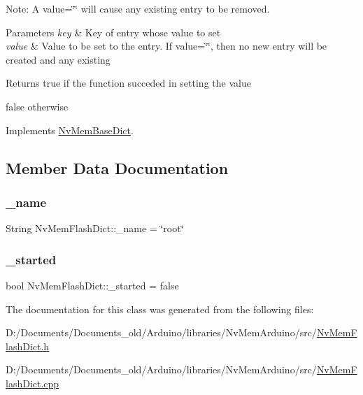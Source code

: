 Note\+: A {\ttfamily value=\char`\"{}\char`\"{}} will cause any existing entry to be removed.


\begin{DoxyParams}{Parameters}
{\em key} & Key of entry whose value to set \\
\hline
{\em value} & Value to be set to the entry. If {\ttfamily value=\char`\"{}\char`\"{}}, then no new entry will be created and any existing \\
\hline
\end{DoxyParams}
\begin{DoxyReturn}{Returns}
true if the function succeded in setting the value 

false otherwise 
\end{DoxyReturn}


Implements \mbox{\hyperlink{class_nv_mem_base_dict_aac0c8ea17230b315ff906bce84e94124}{Nv\+Mem\+Base\+Dict}}.



\subsection{Member Data Documentation}
\mbox{\label{class_nv_mem_flash_dict_a3c15fe330f54d1853ec7b5b2002e3190}} 
\subsubsection{\texorpdfstring{\_name}{\_name}}
{\footnotesize\ttfamily String Nv\+Mem\+Flash\+Dict\+::\+\_\+name = \char`\"{}root\char`\"{}\hspace{0.3cm}{\ttfamily [protected]}}

\mbox{\label{class_nv_mem_flash_dict_ad134004e0f89ea8b0d334d9c5cc8a795}} 
\subsubsection{\texorpdfstring{\_started}{\_started}}
{\footnotesize\ttfamily bool Nv\+Mem\+Flash\+Dict\+::\+\_\+started = false\hspace{0.3cm}{\ttfamily [protected]}}



The documentation for this class was generated from the following files\+:\begin{DoxyCompactItemize}
\item 
D\+:/\+Documents/\+Documents\+\_\+old/\+Arduino/libraries/\+Nv\+Mem\+Arduino/src/\mbox{\hyperlink{_nv_mem_flash_dict_8h}{Nv\+Mem\+Flash\+Dict.\+h}}\item 
D\+:/\+Documents/\+Documents\+\_\+old/\+Arduino/libraries/\+Nv\+Mem\+Arduino/src/\mbox{\hyperlink{_nv_mem_flash_dict_8cpp}{Nv\+Mem\+Flash\+Dict.\+cpp}}\end{DoxyCompactItemize}
